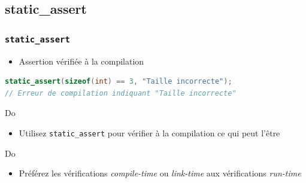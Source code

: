 \documentclass[C++.tex]{subfiles}
\begin{document}
\subsection*{static\_assert}
\begin{frame}[fragile]
	\frametitle{\lstinline|static_assert|}
	\begin{itemize}
		\item Assertion vérifiée à la compilation
	\end{itemize}

	\begin{lstlisting}[language=C++]
static_assert(sizeof(int) == 3, "Taille incorrecte");
// Erreur de compilation indiquant "Taille incorrecte"\end{lstlisting}

	\begin{exampleblock}{Do}
		\begin{itemize}
			\item Utilisez \lstinline|static_assert| pour vérifier à la compilation ce qui peut l'être
		\end{itemize}
	\end{exampleblock}

	\begin{exampleblock}{Do}
		\begin{itemize}
			\item Préférez les vérifications \textit{compile-time} ou \textit{link-time} aux vérifications \textit{run-time}
		\end{itemize}

	\end{exampleblock}
\end{frame}
\end{document}
